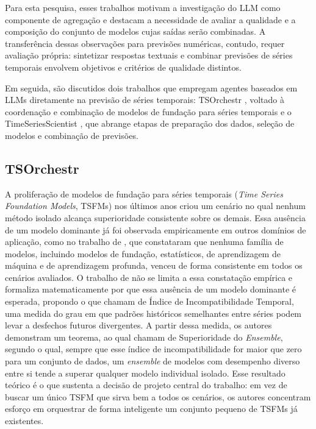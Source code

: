 Para esta pesquisa, esses trabalhos motivam a investigação do LLM como componente de agregação e destacam a necessidade de avaliar a qualidade e a composição do conjunto de modelos cujas saídas serão combinadas. A transferência dessas observações para previsões numéricas, contudo, requer avaliação própria: sintetizar respostas textuais e combinar previsões de séries temporais envolvem objetivos e critérios de qualidade distintos.

Em seguida, são discutidos dois trabalhos que empregam agentes baseados em LLMs diretamente na previsão de séries temporais: TSOrchestr \citep{cao2025tsorchestr}, voltado à coordenação e combinação de modelos de fundação para séries temporais e o TimeSeriesScientist \citep{zhao2025timeseriesscientist}, que abrange etapas de preparação dos dados, seleção de modelos e combinação de previsões.


\subsection{TSOrchestr}
\label{subsec:tsorchestr}
A proliferação de modelos de fundação para séries temporais (\textit{Time Series Foundation Models}, TSFMs) nos últimos anos criou um cenário no qual nenhum método isolado alcança superioridade consistente sobre os demais. Essa ausência de um modelo dominante já foi observada empiricamente em outros domínios de aplicação, como no trabalho de \citet{krause2026foundation}, que constataram que nenhuma família de modelos, incluindo modelos de fundação, estatísticos, de aprendizagem de máquina e de aprendizagem profunda, venceu de forma consistente em todos os cenários avaliados. O trabalho de \citet{cao2025tsorchestr} não se limita a essa constatação empírica e formaliza matematicamente por que essa ausência de um modelo dominante é esperada, propondo o que chamam de Índice de Incompatibilidade Temporal, uma medida do grau em que padrões históricos semelhantes entre séries podem levar a desfechos futuros divergentes. A partir dessa medida, os autores demonstram um teorema, ao qual chamam de Superioridade do \textit{Ensemble}, segundo o qual, sempre que esse índice de incompatibilidade for maior que zero para um conjunto de dados, um \textit{ensemble} de modelos com desempenho diverso entre si tende a superar qualquer modelo individual isolado. Esse resultado teórico é o que sustenta a decisão de projeto central do trabalho: em vez de buscar um único TSFM que sirva bem a todos os cenários, os autores concentram esforço em orquestrar de forma inteligente um conjunto pequeno de TSFMs já existentes.

